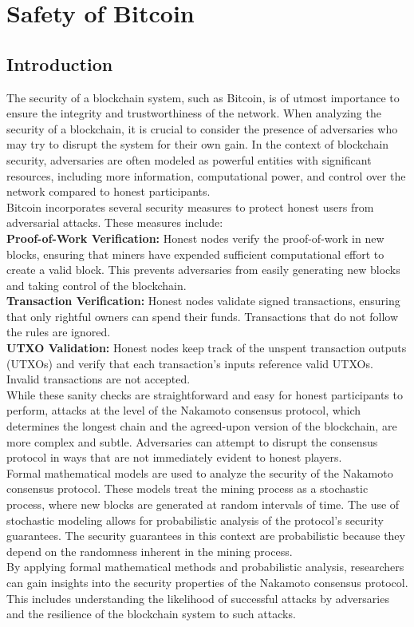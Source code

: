 \chapter{Safety of Bitcoin}

\section{Introduction}

The security of a blockchain system, such as Bitcoin, is of utmost importance to ensure the integrity and trustworthiness of the network. When analyzing the security of a blockchain, it is crucial to consider the presence of adversaries who may try to disrupt the system for their own gain. In the context of blockchain security, adversaries are often modeled as powerful entities with significant resources, including more information, computational power, and control over the network compared to honest participants.\\
Bitcoin incorporates several security measures to protect honest users from adversarial attacks. These measures include:\\
\textbf{Proof-of-Work Verification:} Honest nodes verify the proof-of-work in new blocks, ensuring that miners have expended sufficient computational effort to create a valid block. This prevents adversaries from easily generating new blocks and taking control of the blockchain.\\
\textbf{Transaction Verification:} Honest nodes validate signed transactions, ensuring that only rightful owners can spend their funds. Transactions that do not follow the rules are ignored.\\
\textbf{UTXO Validation:} Honest nodes keep track of the unspent transaction outputs (UTXOs) and verify that each transaction's inputs reference valid UTXOs. Invalid transactions are not accepted.\\
While these sanity checks are straightforward and easy for honest participants to perform, attacks at the level of the Nakamoto consensus protocol, which determines the longest chain and the agreed-upon version of the blockchain, are more complex and subtle. Adversaries can attempt to disrupt the consensus protocol in ways that are not immediately evident to honest players.\\
Formal mathematical models are used to analyze the security of the Nakamoto consensus protocol. These models treat the mining process as a stochastic process, where new blocks are generated at random intervals of time. The use of stochastic modeling allows for probabilistic analysis of the protocol's security guarantees. The security guarantees in this context are probabilistic because they depend on the randomness inherent in the mining process.\\
By applying formal mathematical methods and probabilistic analysis, researchers can gain insights into the security properties of the Nakamoto consensus protocol. This includes understanding the likelihood of successful attacks by adversaries and the resilience of the blockchain system to such attacks.

